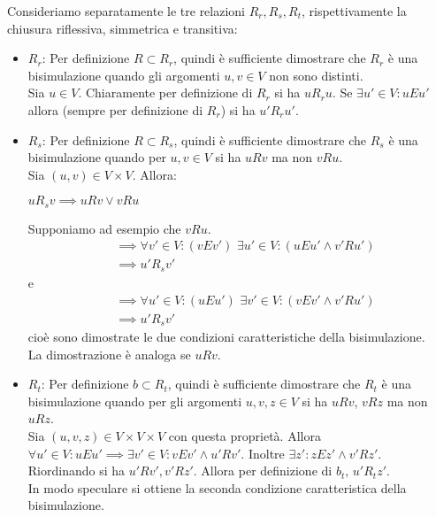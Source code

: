 \begin{proof2}
    Consideriamo separatamente le tre relazioni $R_r, R_s, R_t$, rispettivamente la chiusura riflessiva, simmetrica e transitiva:
    \begin{itemize}
        \item $R_r$: Per definizione $R \subset R_r$, quindi è sufficiente dimostrare che $R_r$ è una bisimulazione quando gli argomenti $u,v \in V$ non sono distinti.\\
        Sia $u \in V$. Chiaramente per definizione di $R_r$ si ha $u R_r u$. Se $\exists u' \in V: u E u'$ allora (sempre per definizione di $R_r$) si ha $u' R_r u'$.
        \item $R_s$: Per definizione $R \subset R_s$, quindi è sufficiente dimostrare che $R_s$ è una bisimulazione quando per $u,v \in V$ si ha $u R v$ ma non $v R u$.\\
        Sia $(u,v) \in V\times V$. Allora:
        \begin{center}
            $u R_s v \implies u R v \lor v R u$
        \end{center}
        Supponiamo ad esempio che $v R u$.
        \begin{align*}
            &\implies \forall v' \in V: (v E v') \,\,\exists u' \in V: (u E u' \land v' R u')\\
            &\implies u' R_s v'
        \end{align*}
        e
        \begin{align*}
            &\implies \forall u' \in V: (u E u') \,\,\exists v' \in V: (v E v' \land v' R u')\\
            &\implies u' R_s v'
        \end{align*}
        cioè sono dimostrate le due condizioni caratteristiche della bisimulazione.\\
        La dimostrazione è analoga se $u R v$.
        \item $R_t$: Per definizione $b \subset R_t$, quindi è sufficiente dimostrare che $R_t$ è una bisimulazione quando per gli argomenti $u,v,z \in V$ si ha $u R v$, $v R z$ ma non $u R z$.\\
        Sia $(u,v,z) \in V\times V\times V$ con questa proprietà. Allora $\forall u' \in V: u E u' \implies \exists v' \in V: v E v' \land u' R v'$. Inoltre $\exists z' : z E z' \land v' R z'$.\\
        Riordinando si ha $u' R v', v' R z'$. Allora per definizione di $b_t, \, u' R_t z'$.\\
        In modo speculare si ottiene la seconda condizione caratteristica della bisimulazione.
    \end{itemize}
\end{proof2}
